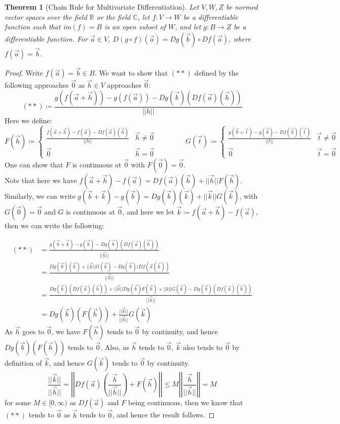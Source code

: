 \documentclass[15pt]{book}
\theoremstyle{break}
\theoremstyle{break}
\newtheorem{thm}{Theorem}[section]
\newcommand{\R}{\mathbb{R}}
\newcommand{\Complex}{\mathbb{C}}
\begin{document}
\begin{thm}[Chain Rule for Multivariate Differentiation]
Let $V,W,Z$ be normed vector spaces over the field $\R$ or the field $\Complex$, let $f:V \to W$ be a differentiable function such that im$(f) = B$ is an open subset of $W$, and let $g:B \to Z$ be a differentiable function. For $\vec{a}\in V$, $D(g\circ f)(\vec{a}) = Dg(\vec{b})\circ Df(\vec{a})$, where $f(\vec{a}) = \vec{b}$.
\end{thm}
\begin{proof}
Write $f(\vec{a}) = \vec{b}\in B$. We want to show that $(**)$ defined by the following approaches $\vec{0}$ as $\vec{h}\in V$ approaches $\vec{0}$: $$(**)\coloneqq\frac{g(f(\vec{a}+\vec{h})) - g(f(\vec{a})) - Dg(\vec{b})(Df(\vec{a})(\vec{h}))}{||h||}$$ Here we define:
$$F(\vec{h}) \coloneqq \begin{cases} \frac{f(\vec{a}+\vec{h})-f(\vec{a})-Df(\vec{a})(\vec{h})}{||h||} & \vec{h}\neq \vec{0} \\ \vec{0}& \vec{h}=\vec{0}\end{cases}\qquad \qquad G(\vec{t}) \coloneqq \begin{cases} \frac{g(\vec{b}+\vec{t})-g(\vec{b})-Df(\vec{b})(\vec{t})}{||t||} & \vec{t}\neq \vec{0} \\ \vec{0}& \vec{t}=\vec{0}\end{cases}$$
One can show that $F$ is continuous at $\vec{0}$ with $F(\vec{0}) = \vec{0}$. \\
Note that here we have $f(\vec{a}+\vec{h}) - f(\vec{a})=Df(\vec{a})(\vec{h})+||\vec{h}||F(\vec{h})$. \\
Similarly, we can write $g(\vec{b}+\vec{k})-g(\vec{b}) = Dg(\vec{b})(\vec{k})+||\vec{k}||G(\vec{k})$, with $G(\vec{0}) = \vec{0}$ and $G$ is continuous at $\vec{0}$, and here we let $\vec{k}\coloneqq f(\vec{a}+\vec{h})-f(\vec{a})$, then we can write the following:

\begin{align*}
(**) &= \frac{g(\vec{b}+\vec{k})-g(\vec{b})-Dg(\vec{b})(Df(\vec{a})(\vec{h}))}{||\vec{h}||} \\&= \frac{Dg(\vec{b})(\vec{k})+||\vec{k}||G(\vec{k})-Dg(\vec{b})(Df(\vec{a}(\vec{h}))}{||\vec{h}||}\\
&= \frac{Dg(\vec{b})(Df(\vec{a})(\vec{h}))+||\vec{h}||Dg(\vec{b})F(\vec{h})+||k||G(\vec{k})-Dg(\vec{b})(Df(\vec{a})(\vec{h}))}{||\vec{h}||}\\
&= Dg(\vec{b})(F(\vec{h}))+\frac{||\vec{k}||}{||\vec{h}||}G(\vec{k})
\end{align*}
As $\vec{h}$ goes to $\vec{0}$, we have $F(\vec{h})$ tends to $\vec{0}$ by continuity, and hence $Dg(\vec{b})(F(\vec{h}))$ tends to $\vec{0}$. Also, as $\vec{h}$ tends to $\vec{0}$, $\vec{k}$ also tends to $\vec{0}$ by definition of $\vec{k}$, and hence $G(\vec{k})$ tends to $\vec{0}$ by continuity. $$\frac{||\vec{k}||}{||\vec{h}||} = \left|\left|Df(\vec{a})\left(\frac{\vec{h}}{||\vec{h}||}\right)+F\left(\vec{h}\right)\right|\right|\leq M\left|\left|\frac{\vec{h}}{||\vec{h}||}\right|\right| = M$$ for some $M \in [0,\infty)$ as $Df(\vec{a})$ and $F$ being continuous, then we know that $(**)$ tends to $\vec{0}$ as $\vec{h}$ tends to $\vec{0}$, and hence the result follows.
\end{proof}
\end{document}
